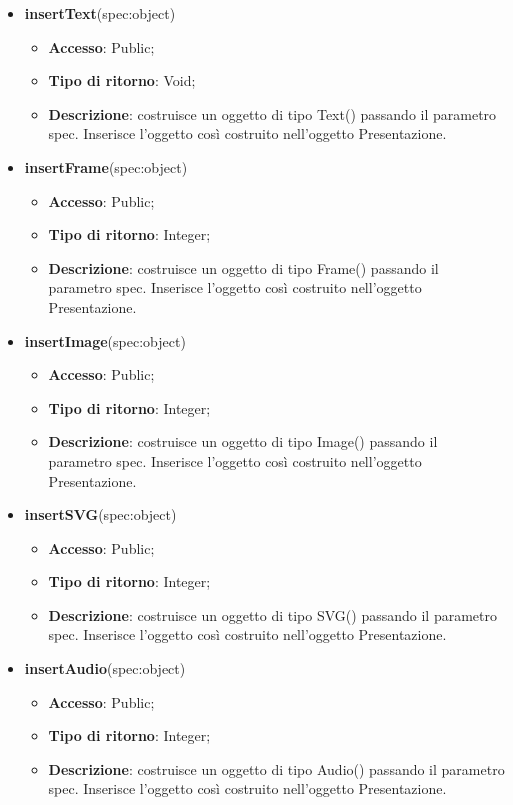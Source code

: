 {\begin{itemize}
			\item \textbf{insertText}(spec:object)
			\begin{itemize}
				\item \textbf{Accesso}: Public;
				\item \textbf{Tipo di ritorno}: Void;
				\item \textbf{Descrizione}: costruisce un oggetto di tipo Text() passando il parametro spec. Inserisce l’oggetto così costruito nell’oggetto Presentazione.
			\end{itemize}
			\item \textbf{insertFrame}(spec:object)
			\begin{itemize}
				\item \textbf{Accesso}: Public;
				\item \textbf{Tipo di ritorno}: Integer;
				\item \textbf{Descrizione}: costruisce un oggetto di tipo Frame() passando il parametro spec. Inserisce l’oggetto così costruito nell’oggetto Presentazione.
			\end{itemize}
			\item \textbf{insertImage}(spec:object)
			\begin{itemize}
				\item \textbf{Accesso}: Public;
				\item \textbf{Tipo di ritorno}: Integer;
				\item \textbf{Descrizione}: costruisce un oggetto di tipo Image() passando il parametro spec. Inserisce l’oggetto così costruito nell’oggetto Presentazione.
			\end{itemize}
			\item \textbf{insertSVG}(spec:object)
			\begin{itemize}
				\item \textbf{Accesso}: Public;
				\item \textbf{Tipo di ritorno}: Integer;
				\item \textbf{Descrizione}: costruisce un oggetto di tipo SVG() passando il parametro spec. Inserisce l’oggetto così costruito nell’oggetto Presentazione.
			\end{itemize}
			\item \textbf{insertAudio}(spec:object)
			\begin{itemize}
				\item \textbf{Accesso}: Public;
				\item \textbf{Tipo di ritorno}: Integer;
				\item \textbf{Descrizione}: costruisce un oggetto di tipo Audio() passando il parametro spec. Inserisce l’oggetto così costruito nell’oggetto Presentazione.

\end{itemize}
\end{itemize}}
